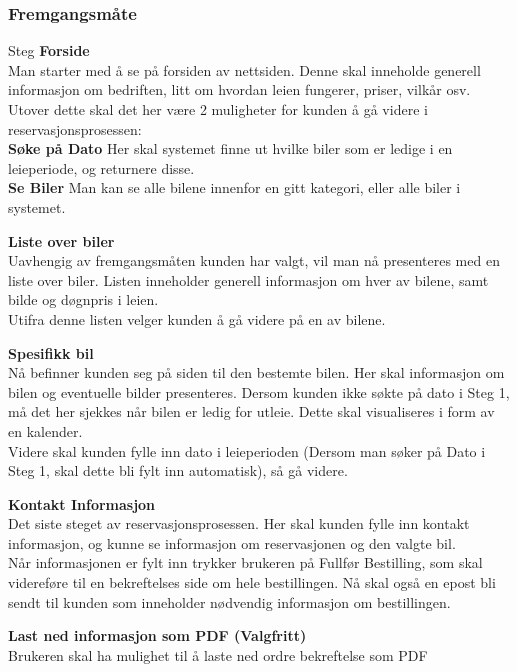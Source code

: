 \subsubsection{Fremgangsmåte}
\begin{steps}{Steg}
\step \textbf{Forside}\\Man starter med å se på forsiden av nettsiden. Denne skal inneholde generell informasjon om bedriften, litt om hvordan leien fungerer, priser, vilkår osv. Utover dette skal det her være 2 muligheter for kunden å gå videre i reservasjonsprosessen:\\
\textbf{Søke på Dato} Her skal systemet finne ut hvilke biler som er ledige i en leieperiode, og returnere disse. \\
\textbf{Se Biler} Man kan se alle bilene innenfor en gitt kategori, eller alle biler i systemet.

\step \textbf{Liste over biler}\\Uavhengig av fremgangsmåten kunden har valgt, vil man nå presenteres med en liste over biler. Listen inneholder generell informasjon om hver av bilene, samt bilde og døgnpris i leien.\\
Utifra denne listen velger kunden å gå videre på en av bilene.

\step \textbf{Spesifikk bil}\\Nå befinner kunden seg på siden til den bestemte bilen. Her skal informasjon om bilen og eventuelle bilder presenteres.
Dersom kunden ikke søkte på dato i Steg 1, må det her sjekkes når bilen er ledig for utleie. Dette skal visualiseres i form av en kalender.\\
Videre skal kunden fylle inn dato i leieperioden (Dersom man søker på Dato i Steg 1, skal dette bli fylt inn automatisk), så gå videre.

\step \textbf{Kontakt Informasjon}\\Det siste steget av reservasjonsprosessen. Her skal kunden fylle inn kontakt informasjon, og kunne se informasjon om reservasjonen og den valgte bil.\\
Når informasjonen er fylt inn trykker brukeren på Fullfør Bestilling, som skal videreføre til en bekreftelses side om hele bestillingen. Nå skal også en epost bli sendt til kunden som inneholder nødvendig informasjon om bestillingen.

\step \textbf{Last ned informasjon som PDF (Valgfritt)}\\Brukeren skal ha mulighet til å laste ned ordre bekreftelse som PDF 

\end{steps}




